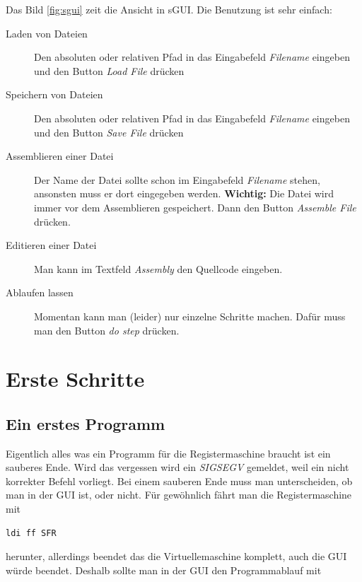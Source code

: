 \documentclass[a4paper,12pt,oneside]{scrreprt}
\begin{document}
Das Bild \ref{fig:sgui} zeit die Ansicht in sGUI.  
Die Benutzung ist sehr einfach:

\begin{description}

\item[Laden von Dateien] Den absoluten oder relativen Pfad in das Eingabefeld \textit{Filename} eingeben und den Button \textit{Load File} drücken

\item[Speichern von Dateien] Den absoluten oder relativen Pfad in das Eingabefeld \textit{Filename} eingeben und den Button \textit{Save File} drücken

\item[Assemblieren einer Datei] Der Name der Datei sollte schon im Eingabefeld \textit{Filename} stehen, ansonsten muss er dort eingegeben werden. \textbf{Wichtig:} Die Datei wird immer vor dem Assemblieren gespeichert. Dann den Button \textit{Assemble File} drücken.

\item[Editieren einer Datei] Man kann im Textfeld \textit{Assembly} den Quellcode eingeben.

\item[Ablaufen lassen] Momentan kann man (leider) nur einzelne Schritte machen. Dafür muss man den Button \textit{do step} drücken.

\end{description}


\chapter{Erste Schritte}

\section{Ein erstes Programm}

Eigentlich alles was ein Programm für die Registermaschine braucht ist ein sauberes Ende. Wird das vergessen wird ein \textit{SIGSEGV} gemeldet, weil ein nicht korrekter Befehl vorliegt. Bei einem sauberen Ende muss man unterscheiden, ob man in der GUI ist, oder nicht. Für gewöhnlich fährt man die Registermaschine mit

\begin{lstlisting}[frame=single]
ldi ff SFR
\end{lstlisting}

herunter, allerdings beendet das die Virtuellemaschine komplett, auch die GUI würde beendet.  
Deshalb sollte man in der GUI den Programmablauf mit
\end{document}
